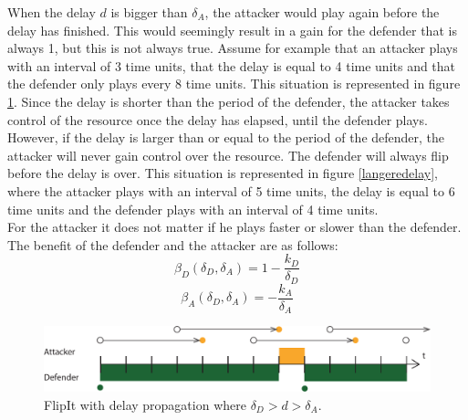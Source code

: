 When the delay $d$ is bigger than $\delta_{A}$, the attacker would play again before the delay has finished. This would seemingly result in a gain for the defender that is always 1, but this is not always true. Assume for example that an attacker plays with an interval of 3 time units, that the delay is equal to 4 time units and that the defender only plays every 8 time units. This situation is represented in figure \ref{langedelay}. Since the delay is shorter than the period of the defender, the attacker takes control of the resource once the delay has elapsed, until the defender plays.\\

However, if the delay is larger than or equal to the period of the defender, the attacker will never gain control over the resource. The defender will always flip before the delay is over. This situation is represented in figure \ref{langeredelay}, where the attacker plays with an interval of 5 time units, the delay is equal to 6 time units and the defender plays with an interval of 4 time units. \\
For the attacker it does not matter if he plays faster or slower than the defender. The benefit of the defender and the attacker are as follows:
\begin{equation}\label{case0def}
\beta_{D}(\delta_{D},\delta_{A})=1-\dfrac{k_{D}}{\delta_{D}}
\end{equation}
\begin{equation}\label{case0att}
\beta_{A}(\delta_{D},\delta_{A})=-\dfrac{k_{A}}{\delta_{A}}
\end{equation}




\begin{figure}[hbtp]
\centering
\includegraphics[scale=0.7]{Images/FlipItCase1delay.pdf} 
\caption{FlipIt with delay propagation where $\delta_{D} > d > \delta_{A}$.   }
\label{langedelay}
\end{figure}

